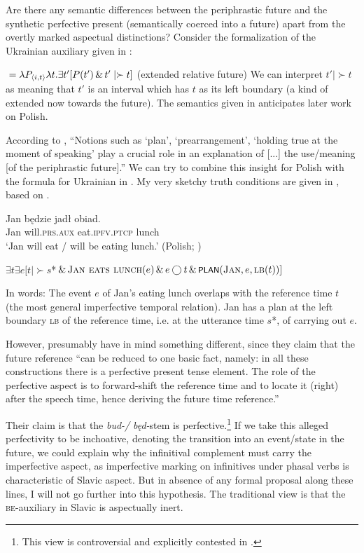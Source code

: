 \documentclass[output=paper,colorlinks,citecolor=brown]{langscibook}
\begin{document}
Are there any semantic differences between the  periphrastic future and the synthetic perfective present (semantically coerced into a future) apart from the overtly marked aspectual distinctions?
Consider the formalization of the Ukrainian auxiliary given in
\citet{stechow99}:

\ea\label{bud-sem}  ${}=\lambda P_{\langle{i,t}\rangle} \lambda t. \exists t' [ P(t') \, \& \, t' \mid\succ t]$ \hfill (extended relative future) 
\z
We can interpret $t' \mid\succ t$ as meaning that $t'$  is an interval which has $t$ as its left boundary (a kind of extended now towards the future). The semantics given in  anticipates later work on Polish.

According to \citet[2]{blaszczak14},  ``Notions such as ‘plan’, ‘prearrangement’, ‘holding true at the moment 
of speaking’ play a crucial role in an explanation of {[...]} the 
use/meaning {[}of the periphrastic future{]}.''  We can try to combine this insight for Polish with 
the formula for Ukrainian in . My very sketchy truth conditions are given in , based on .

\ea \ea\label{polfut}\gll Jan b{ę}dzie jad{ł} obiad.\\
Jan will.\textsc{prs}.\textsc{aux} eat.\textsc{ipfv}.\textsc{ptcp}  lunch \\
\glt ‘Jan will eat / will be eating lunch.’ \hfill (Polish; \cite{blaszczak14})

\ex\label{ex14}
$\exists t \exists e [t \mid\succ s$*$ \, \& \, \textsc{Jan eats lunch}(e) \, \& \, e\bigcirc t \, \& \, \cnst{plan}(\textsc{Jan},e,\textsc{lb}(t))]$
\z\z

In words: The event $e$ of Jan's eating lunch overlaps with the reference time $t$ (the most general imperfective temporal relation). Jan has a plan at the left boundary \textsc{lb} of the reference time, i.e. at the utterance time $s$*, of carrying out $e$. 
 
However, \citet[2]{blaszczak14} presumably have in mind something   different, since they claim that the future reference ``can be reduced to one basic fact, namely: in all these constructions 
there is a perfective present tense element. The role of the perfective aspect is  to forward-shift the reference time and to locate it (right) after the 
speech time, hence deriving the future time reference.''

Their claim is that the {\textit{bud-/}} \textit{b{ę}d-}stem   is perfective.\footnote{This view is controversial and explicitly contested in \citet{pitsch15}.} If we take this alleged perfectivity  to be inchoative, denoting the transition into an  event/state in the future, we could explain why the infinitival complement   must carry the imperfective aspect, as imperfective marking on infinitives under phasal verbs is characteristic of Slavic aspect. But in absence of any formal proposal along these lines, I will not go further into this hypothesis. The traditional view is that the \textsc{be}-auxiliary in Slavic is aspectually inert.
\end{document}
